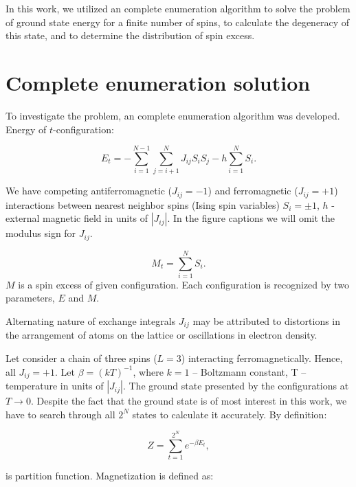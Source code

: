 \documentclass[preprint,12pt]{elsarticle}
\begin{document}
	In this work, we utilized an complete enumeration algorithm \cite{dias2023ground, padalko2021parallel} to solve the problem of ground state energy for a finite number of spins, to calculate the degeneracy of this state, and to determine the distribution of spin excess.
	
	\section{Complete enumeration solution}
	
	To investigate the problem, an complete enumeration algorithm was developed. Energy of $t$-configuration:
	
	\begin{equation}
		E_t = -\sum^{N - 1}_{i=1}\sum^N_{j = i + 1} J_{ij} S_i S_j - h \sum^N_{i=1} S_i.
		\label{eq:ising_energy}
	\end{equation}
	
	We have competing antiferromagnetic ($J_{ij} = -1$) and ferromagnetic ($J_{ij} = +1$) interactions between nearest neighbor spins (Ising spin variables) $S_i = \pm1$, $h$ - external magnetic field in units of $|J_{ij}|$. In the figure captions we will omit the modulus sign for $J_{ij}$.
	
	\begin{equation}
		M_t = \sum^N_{i=1} S_i.
		\label{eq:spin_excess} 
	\end{equation}
	$M$ is a spin excess of given configuration. Each configuration is recognized by two parameters, $E$ and $M$.
	
	
	Alternating nature of exchange integrals $J_{ij}$ may be attributed to distortions in the arrangement of atoms on the lattice or oscillations in electron density.
	
	Let consider a chain of three spins ($L = 3$) interacting ferromagnetically. Hence, all $J_{ij} = +1$. Let $\beta = (kT)^{-1}$, where $k = 1$ -- Boltzmann constant, T -- temperature in units of $|J_{ij}|$. The ground state presented by the configurations at $T \rightarrow 0$. Despite the fact that the ground state is of most interest in this work, we have to search through all $2^N$ states to calculate it accurately. By definition:
	
		\begin{equation}
		Z = \sum_{t = 1}^{2 ^ N} e^{-\beta E_t},
		\label{eq:stat_difinition}
	\end{equation}
	
	\noindent is partition function. Magnetization is defined as: 
	
\end{document}
